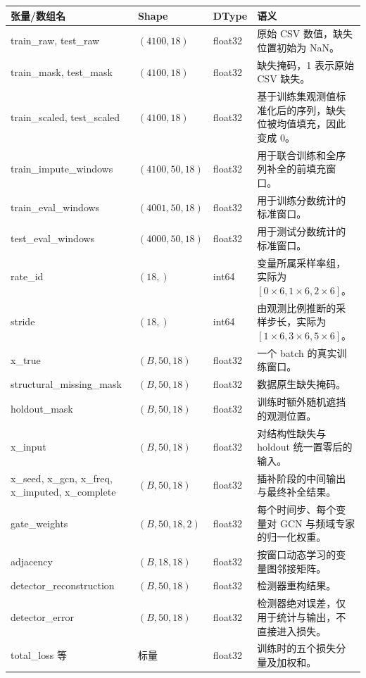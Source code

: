 \documentclass[11pt,a4paper]{ctexart}
\newcommand{\code}[1]{{\ttfamily\small #1}}
\begin{document}
\begin{longtable}{L{4.4cm}L{2.2cm}L{1.6cm}L{5.8cm}}
\toprule
张量/数组名 & Shape & DType & 语义 \\
\midrule
\endhead
\code{train\_raw}, \code{test\_raw} & $(4100, 18)$ & \code{float32} & 原始 CSV 数值，缺失位置初始为 NaN。 \\
\code{train\_mask}, \code{test\_mask} & $(4100, 18)$ & \code{float32} & 缺失掩码，1 表示原始 CSV 缺失。 \\
\code{train\_scaled}, \code{test\_scaled} & $(4100, 18)$ & \code{float32} & 基于训练集观测值标准化后的序列，缺失位被均值填充，因此变成 0。 \\
\code{train\_impute\_windows} & $(4100, 50, 18)$ & \code{float32} & 用于联合训练和全序列补全的前填充窗口。 \\
\code{train\_eval\_windows} & $(4001, 50, 18)$ & \code{float32} & 用于训练分数统计的标准窗口。 \\
\code{test\_eval\_windows} & $(4000, 50, 18)$ & \code{float32} & 用于测试分数统计的标准窗口。 \\
\code{rate\_id} & $(18,)$ & \code{int64} & 变量所属采样率组，实际为 $[0 \times 6, 1 \times 6, 2 \times 6]$。 \\
\code{stride} & $(18,)$ & \code{int64} & 由观测比例推断的采样步长，实际为 $[1 \times 6, 3 \times 6, 5 \times 6]$。 \\
\code{x\_true} & $(B, 50, 18)$ & \code{float32} & 一个 batch 的真实训练窗口。 \\
\code{structural\_missing\_mask} & $(B, 50, 18)$ & \code{float32} & 数据原生缺失掩码。 \\
\code{holdout\_mask} & $(B, 50, 18)$ & \code{float32} & 训练时额外随机遮挡的观测位置。 \\
\code{x\_input} & $(B, 50, 18)$ & \code{float32} & 对结构性缺失与 holdout 统一置零后的输入。 \\
\code{x\_seed}, \code{x\_gcn}, \code{x\_freq}, \code{x\_imputed}, \code{x\_complete} & $(B, 50, 18)$ & \code{float32} & 插补阶段的中间输出与最终补全结果。 \\
\code{gate\_weights} & $(B, 50, 18, 2)$ & \code{float32} & 每个时间步、每个变量对 GCN 与频域专家的归一化权重。 \\
\code{adjacency} & $(B, 18, 18)$ & \code{float32} & 按窗口动态学习的变量图邻接矩阵。 \\
\code{detector\_reconstruction} & $(B, 50, 18)$ & \code{float32} & 检测器重构结果。 \\
\code{detector\_error} & $(B, 50, 18)$ & \code{float32} & 检测器绝对误差，仅用于统计与输出，不直接进入损失。 \\
\code{total\_loss} 等 & 标量 & \code{float32} & 训练时的五个损失分量及加权和。 \\
\bottomrule
\end{longtable}
\end{document}
